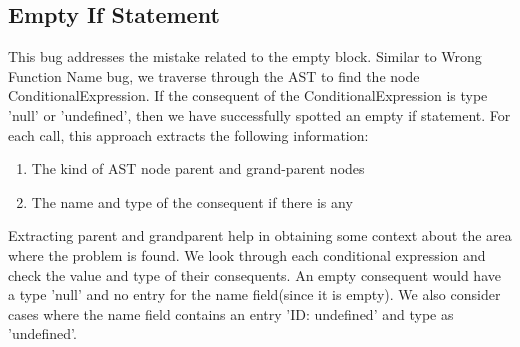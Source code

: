 \documentclass[sigconf]{acmart}
\begin{document}
\subsection{Empty If Statement}
This bug addresses the mistake related to the empty block. Similar to Wrong Function Name bug, we traverse through the AST to find the node ConditionalExpression. If the consequent of the ConditionalExpression is type 'null' or 'undefined', then we have successfully spotted an empty if statement. For each call, this approach extracts the following information:
\begin{enumerate}
    \item The kind of AST node parent and grand-parent nodes 
    \item The name and type of the consequent if there is any
\end{enumerate}
Extracting parent and grandparent help in obtaining some context about the area where the problem is found. We look through each conditional expression and check the value and type of their consequents. An empty consequent would have a type 'null' and no entry for the name field(since it is empty). We also consider cases where the name field contains an entry 'ID: undefined' and type as 'undefined'.  
\end{document}
